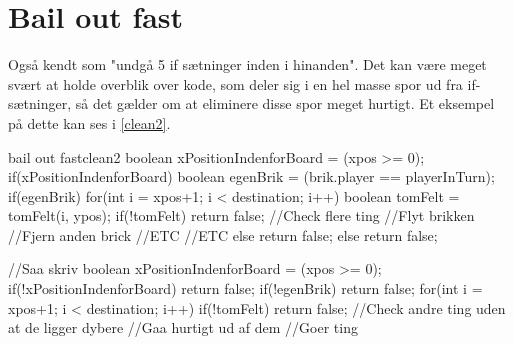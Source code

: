 \section{Bail out fast}
Også kendt som "undgå 5 if sætninger inden i hinanden". Det kan være meget svært at holde overblik over kode, som deler sig i en hel masse spor ud fra if-sætninger, så det gælder om at eliminere disse spor meget hurtigt. Et eksempel på dette kan ses i \autoref{clean2}.
\begin{JavaCode}{bail out fast}{clean2}
	boolean xPositionIndenforBoard = (xpos >= 0);
	if(xPositionIndenforBoard){
		boolean egenBrik = (brik.player == playerInTurn);
		if(egenBrik){
			for(int i = xpos+1; i < destination; i++){
				boolean tomFelt = tomFelt(i, ypos);
				if(!tomFelt){
					return false;
				}
			}
			//Check flere ting
			//Flyt brikken
			//Fjern anden brick
			//ETC
			//ETC
		} else {
			return false;
		}
	} else {
		return false;
	}
	
	//Saa skriv
	boolean xPositionIndenforBoard = (xpos >= 0);
	if(!xPositionIndenforBoard){
		return false;
	}
	if(!egenBrik){
		return false;
	}
	for(int i = xpos+1; i < destination; i++){
		if(!tomFelt){
			return false;
		}	
	}
	//Check andre ting uden at de ligger dybere
	//Gaa hurtigt ud af dem
	//Goer ting 
\end{JavaCode}
